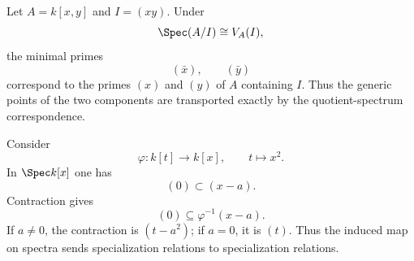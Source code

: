 \begin{example}
Let $A=k[x,y]$ and $I=(xy)$.  Under
\[
\Spec(A/I)\cong V_A(I),
\]
the minimal primes
\[
(\bar x),\qquad(\bar y)
\]
correspond to the primes $(x)$ and $(y)$ of $A$ containing $I$.  Thus the generic points
of the two components are transported exactly by the quotient-spectrum correspondence.
\end{example}

\begin{example}
Consider
\[
\varphi:k[t]\longrightarrow k[x],\qquad t\longmapsto x^2.
\]
In $\Spec k[x]$ one has
\[
(0)\subset(x-a).
\]
Contraction gives
\[
(0)\subseteq\varphi^{-1}(x-a).
\]
If $a\neq0$, the contraction is $(t-a^2)$; if $a=0$, it is $(t)$.  Thus the induced map
on spectra sends specialization relations to specialization relations.
\end{example}
